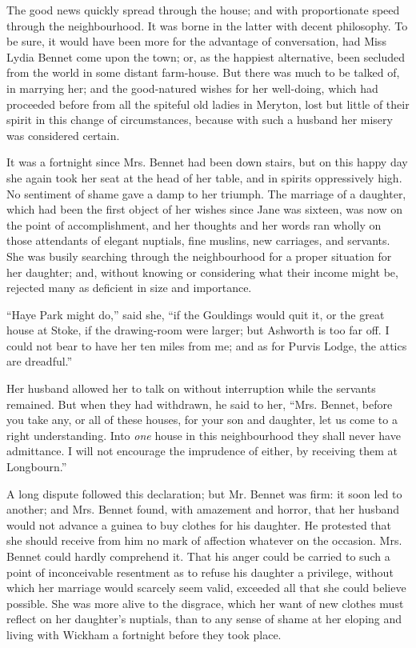 The good news quickly spread through the house; and with proportionate speed through the neighbourhood. It was borne in the latter with decent philosophy. To be sure, it would have been more for the advantage of conversation, had Miss Lydia Bennet come upon the town; or, as the happiest alternative, been secluded from the world in some distant farm-house. But there was much to be talked of, in marrying her; and the good-natured wishes for her well-doing, which had proceeded before from all the spiteful old ladies in Meryton, lost but little of their spirit in this change of circumstances, because with such a husband her misery was considered certain.

It was a fortnight since Mrs. Bennet had been down stairs, but on this happy day she again took her seat at the head of her table, and in spirits oppressively high. No sentiment of shame gave a damp to her triumph. The marriage of a daughter, which had been the first object of her wishes since Jane was sixteen, was now on the point of accomplishment, and her thoughts and her words ran wholly on those attendants of elegant nuptials, fine muslins, new carriages, and servants. She was busily searching through the neighbourhood for a proper situation for her daughter; and, without knowing or considering what their income might be, rejected many as deficient in size and importance.

``Haye Park might do,'' said she, ``if the Gouldings would quit it, or the great house at Stoke, if the drawing-room were larger; but Ashworth is too far off. I could not bear to have her ten miles from me; and as for Purvis Lodge, the attics are dreadful.''

Her husband allowed her to talk on without interruption while the servants remained. But when they had withdrawn, he said to her, ``Mrs. Bennet, before you take any, or all of these houses, for your son and daughter, let us come to a right understanding. Into \textit{one} house in this neighbourhood they shall never have admittance. I will not encourage the imprudence of either, by receiving them at Longbourn.''

A long dispute followed this declaration; but Mr. Bennet was firm: it soon led to another; and Mrs. Bennet found, with amazement and horror, that her husband would not advance a guinea to buy clothes for his daughter. He protested that she should receive from him no mark of affection whatever on the occasion. Mrs. Bennet could hardly comprehend it. That his anger could be carried to such a point of inconceivable resentment as to refuse his daughter a privilege, without which her marriage would scarcely seem valid, exceeded all that she could believe possible. She was more alive to the disgrace, which her want of new clothes must reflect on her daughter's nuptials, than to any sense of shame at her eloping and living with Wickham a fortnight before they took place.


